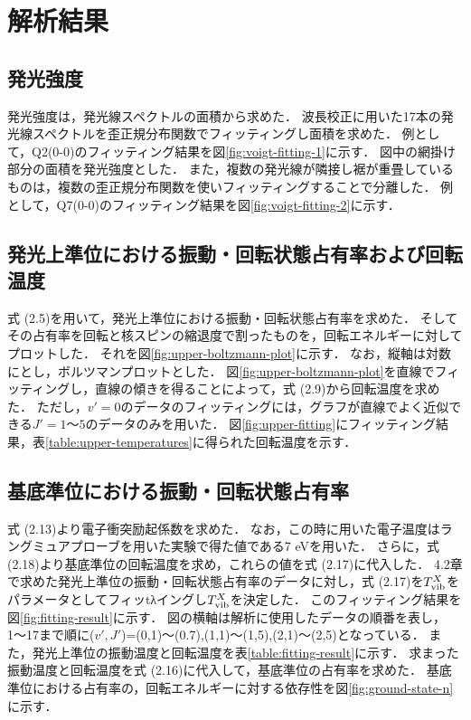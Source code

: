 \chapter{解析結果}

\section{発光強度}
発光強度は，発光線スペクトルの面積から求めた．
波長校正に用いた17本の発光線スペクトルを歪正規分布関数でフィッティングし面積を求めた．
例として，Q2(0-0)のフィッティング結果を図\ref{fig:voigt-fitting-1}に示す．
図中の網掛け部分の面積を発光強度とした．
また，複数の発光線が隣接し裾が重畳しているものは，複数の歪正規分布関数を使いフィッティングすることで分離した．
例として，Q7(0-0)のフィッティング結果を図\ref{fig:voigt-fitting-2}に示す．

\section{発光上準位における振動・回転状態占有率および回転温度}
式 (2.5)を用いて，発光上準位における振動・回転状態占有率を求めた．
そしてその占有率を回転と核スピンの縮退度で割ったものを，回転エネルギーに対してプロットした．
それを図\ref{fig:upper-boltzmann-plot}に示す．
なお，縦軸は対数にとし，ボルツマンプロットとした．
図\ref{fig:upper-boltzmann-plot}を直線でフィッティングし，直線の傾きを得ることによって，式 (2.9)から回転温度を求めた．
ただし，$v'=0$のデータのフィッティングには，グラフが直線でよく近似できる$J'=1〜5$のデータのみを用いた．
図\ref{fig:upper-fitting}にフィッティング結果，表\ref{table:upper-temperatures}に得られた回転温度を示す．

\section{基底準位における振動・回転状態占有率}
式 (2.13)より電子衝突励起係数を求めた．
なお，この時に用いた電子温度はラングミュアプローブを用いた実験で得た値である7 eV\cite{yun}を用いた．
さらに，式 (2.18)より基底準位の回転温度を求め，これらの値を式 (2.17)に代入した．
4.2章で求めた発光上準位の振動・回転状態占有率のデータに対し，式 (2.17)を$T^X_{\rm vib}$をパラメータとしてフィッtλイングし$T^X_{\rm vib}$を決定した．
このフィッティング結果を図\ref{fig:fitting-result}に示す．
図の横軸は解析に使用したデータの順番を表し，1〜17まで順に($v',J'$)=(0,1)〜(0.7),(1,1)〜(1,5),(2,1)〜(2,5)となっている．
また，発光上準位の振動温度と回転温度を表\ref{table:fitting-result}に示す．
求まった振動温度と回転温度を式 (2.16)に代入して，基底準位の占有率を求めた．
基底準位における占有率の，回転エネルギーに対する依存性を図\ref{fig:ground-state-n}に示す．